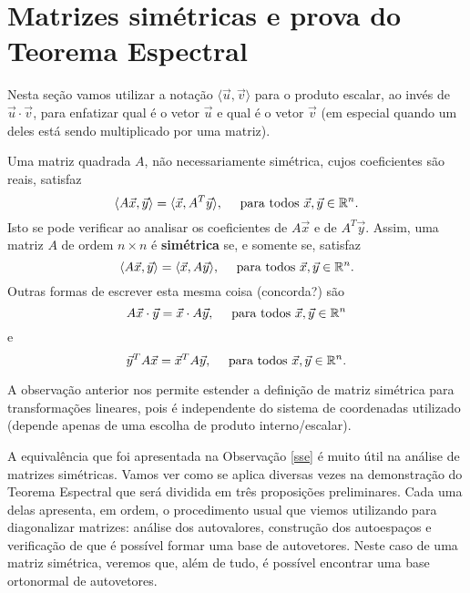 \documentclass[../livro.tex]{subfiles}
\begin{document}
\section{Matrizes simétricas e prova do Teorema Espectral}

Nesta seção vamos utilizar a notação $\langle \vec{u}, \vec{v} \rangle$ para o produto escalar, ao invés de $\vec{u} \cdot \vec{v}$, para enfatizar qual é o vetor $\vec{u}$ e qual é o vetor $\vec{v}$ (em especial quando um deles está sendo multiplicado por uma matriz).

\begin{remark}\label{sse}
	Uma matriz quadrada $A$, não necessariamente simétrica, cujos coeficientes são reais, satisfaz
	\[
	\langle A \vec{x}, \vec{y} \rangle = \langle\vec{x}, A^T \vec{y}\rangle, \quad \text{ para todos } \vec{x}, \vec{y} \in \mathbb{R}^n.
	\] Isto se pode verificar ao analisar os coeficientes de $A \vec{x}$ e de $A^T \vec{y}$. Assim, uma matriz $A$ de ordem $n \times n$ é \textbf{simétrica} se, e somente se, satisfaz
	\[
	\langle A \vec{x}, \vec{y} \rangle = \langle\vec{x}, A \vec{y}\rangle, \quad \text{ para todos } \vec{x}, \vec{y} \in \mathbb{R}^n.
	\]
	Outras formas de escrever esta mesma coisa (concorda?) são
	\[
	A \vec{x} \cdot \vec{y} = \vec{x} \cdot A \vec{y}, \quad \text{ para todos } \vec{x}, \vec{y} \in \mathbb{R}^n
	\] e 
	\[
	\vec{y}^T A \vec{x} = \vec{x}^T A \vec{y}, \quad \text{ para todos } \vec{x}, \vec{y} \in \mathbb{R}^n.
	\]
\end{remark}

\begin{remark}
	A observação anterior nos permite estender a definição de matriz simétrica para transformações lineares, pois é independente do sistema de coordenadas utilizado (depende apenas de uma escolha de produto interno/escalar). 
\end{remark}

A equivalência que foi apresentada na Observação \ref{sse} é muito útil na análise de matrizes simétricas. Vamos ver como se aplica diversas vezes na demonstração do Teorema Espectral que será dividida em três proposições preliminares. Cada uma delas apresenta, em ordem, o procedimento usual que viemos utilizando para diagonalizar matrizes: análise dos autovalores, construção dos autoespaços e verificação de que é possível formar uma base de autovetores. Neste caso de uma matriz simétrica, veremos que, além de tudo, é possível encontrar uma base ortonormal de autovetores.
\end{document}
